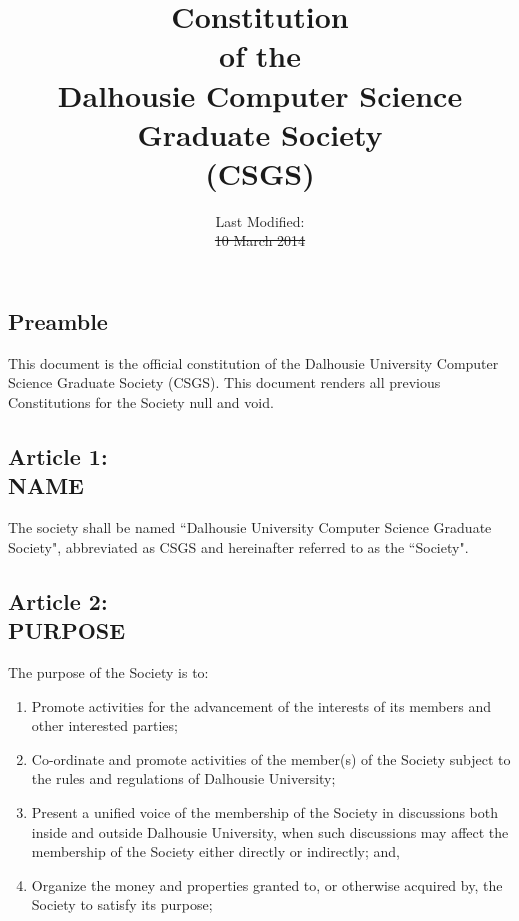 \documentclass[]{report}
\title{Constitution\\of the\\Dalhousie Computer Science Graduate Society\\(CSGS)}
\author{ }
\date{Last Modified:\\\st{10 March 2014}\\\color{red}{13 March 2015}}
\begin{document}
\maketitle

\clearpage
\begin{center}
	\section*{Preamble}
	\vspace{12px}
\end{center}
\label{preamble}
	This document is the official constitution of the Dalhousie University Computer Science Graduate Society (CSGS). This document renders all previous Constitutions for the Society null and void.


\clearpage
\color{red}{
	\tableofcontents
}
\color{black}

\clearpage
\begin{center}
	\section*{Article 1:\\NAME}
	\vspace{12px}
\end{center}
\label{name}
	The society shall be named ``Dalhousie University Computer Science Graduate Society", abbreviated as CSGS and hereinafter referred to as the ``Society".


\clearpage
\begin{center}
	\section*{Article 2:\\PURPOSE}
	\vspace{12px}
\end{center}
\label{purpose}

	The purpose of the Society is to:\\
	
	\renewcommand{\theenumi}{\Alph{enumi}}
	\begin{enumerate}
	
		\item Promote activities for the advancement of the interests of its members and other interested parties;
		
		\item Co-ordinate and promote activities of the member(s) of the Society subject to the rules and regulations of Dalhousie University;
		
		\item Present a unified voice of the membership of the Society in discussions both inside and outside Dalhousie University, when such discussions may affect the membership of the Society either directly or indirectly; and,
		
		\item Organize the money and properties granted to, or otherwise acquired by, the Society to satisfy its purpose;

	\end{enumerate}
\end{document}
